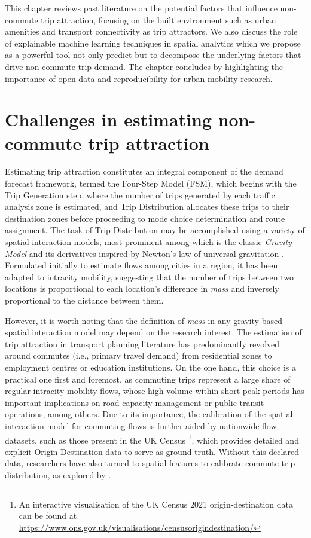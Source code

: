 
This chapter reviews past literature on the potential factors that influence non-commute trip attraction, focusing on the built environment such as urban amenities and transport connectivity as trip attractors. We also discuss the role of explainable machine learning techniques in spatial analytics which we propose as a powerful tool not only predict but to decompose the underlying factors that drive non-commute trip demand. The chapter concludes by highlighting the importance of open data and reproducibility for urban mobility research.

\section{Challenges in estimating non-commute trip attraction}

Estimating trip attraction constitutes an integral component of the demand forecast framework, termed the Four-Step Model (FSM), which begins with the Trip Generation step, where the number of trips generated by each traffic analysis zone is estimated, and Trip Distribution allocates these trips to their destination zones before proceeding to mode choice determination and route assignment. The task of Trip Distribution may be accomplished using a variety of spatial interaction models, most prominent among which is the classic \textit{Gravity Model} and its derivatives inspired by Newton's law of universal gravitation \citep{erlanderGravityModelTransportation1990}. Formulated initially to estimate flows among cities in a region, it has been adapted to intracity mobility, suggesting that the number of trips between two locations is proportional to each location's difference in \textit{mass} and inversely proportional to the distance between them. 

However, it is worth noting that the definition of \textit{mass} in any gravity-based spatial interaction model may depend on the research interest. The estimation of trip attraction in transport planning literature has predominantly revolved around commutes (i.e., primary travel demand) from residential zones to employment centres or education institutions. On the one hand, this choice is a practical one first and foremost, as commuting trips represent a large share of regular intracity mobility flows, whose high volume within short peak periods has important implications on road capacity management or public transit operations, among others. Due to its importance, the calibration of the spatial interaction model for commuting flows is further aided by nationwide flow datasets, such as those present in the UK Census \footnote{An interactive visualisation of the UK Census 2021 origin-destination data can be found at \url{https://www.ons.gov.uk/visualisations/censusorigindestination/}}, which provides detailed and explicit Origin-Destination data to serve as ground truth. Without this declared data, researchers have also turned to spatial features to calibrate commute trip distribution, as explored by \cite{yangLimitsPredictabilityCommuting2014}.

